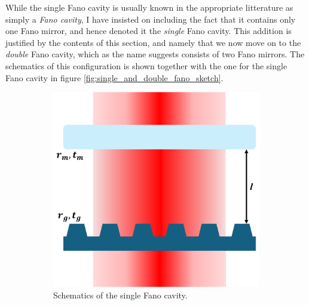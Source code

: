 While the single Fano cavity is usually known in the appropriate litterature as simply a \emph{Fano cavity}, I have insisted on including the fact that it contains only one Fano mirror, and hence denoted it the \emph{single} Fano cavity. This addition is justified by the contents of this section, and namely that we now move on to the \emph{double} Fano cavity, which as the name suggests consists of two Fano mirrors. The schematics of this configuration is shown together with the one for the single Fano cavity in figure \ref{fig:single_and_double_fano_sketch}.

\begin{figure}[h!]
    \centering
    \begin{subfigure}[b]{0.3\textwidth}
        \includegraphics[width=\textwidth]{figures/single_fano_sketch.pdf}
        \caption{Schematics of the single Fano cavity.}
        \label{fig:single_fano_sketch2}
    \end{subfigure}
    \hspace{1cm}
    \begin{subfigure}[b]{0.3\textwidth}

\end{subfigure}
\end{figure}
